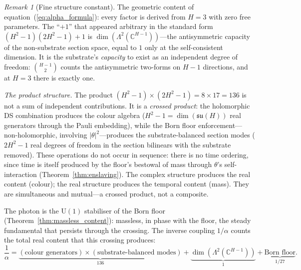 \documentclass[11pt,a4paper]{article}
\theoremstyle{definition}
\theoremstyle{remark}
\newtheorem{remark}[theorem]{Remark}
\newcommand{\C}{\mathbb{C}}
\newcommand{\su}{\mathfrak{su}}
\begin{document}
\begin{remark}[Fine structure constant]\label{rem:alpha}
The geometric content of equation~(\ref{eq:alpha_formula}): every factor is derived from $H=3$ with zero free parameters. The ``$+1$'' that appeared arbitrary in the standard form $(H^2\!-\!1)(2H^2\!-\!1)+1$ is $\dim(\Lambda^2(\C^{H-1}))$---the antisymmetric capacity of the non-substrate section space, equal to $1$ only at the self-consistent dimension. It is the substrate's \emph{capacity} to exist as an independent degree of freedom: $\binom{H-1}{2}$ counts the antisymmetric two-forms on $H\!-\!1$ directions, and at $H=3$ there is exactly one.

\emph{The product structure.} The product $(H^2\!-\!1)\times(2H^2\!-\!1)=8\times 17=136$ is not a sum of independent contributions. It is a \emph{crossed product}: the holomorphic DS combination produces the colour algebra ($H^2\!-\!1=\dim(\su(H))$ real generators through the Pauli embedding), while the Born floor enforcement---non-holomorphic, involving $|\theta|^2$---produces the substrate-balanced section modes ($2H^2\!-\!1$ real degrees of freedom in the section bilinears with the substrate removed). These operations do not occur in sequence: there is no time ordering, since time is itself produced by the floor's bestowal of mass through $\theta$'s self-interaction (Theorem~\ref{thm:enslaving}). The complex structure produces the real content (colour); the real structure produces the temporal content (mass). They are simultaneous and mutual---a crossed product, not a composite.

The photon is the $\mathrm{U}(1)$ stabiliser of the Born floor (Theorem~\ref{thm:massless_content}): massless, in phase with the floor, the steady fundamental that persists through the crossing. The inverse coupling $1/\alpha$ counts the total real content that this crossing produces:
\begin{equation}\label{eq:alpha_content}
\frac{1}{\alpha} = \underbrace{(\text{colour generators})\times(\text{substrate-balanced modes})}_{136} + \underbrace{\dim(\Lambda^2(\C^{H-1}))}_{1} + \underbrace{\text{Born floor}}_{1/27}.
\end{equation}


\end{remark}
\end{document}
